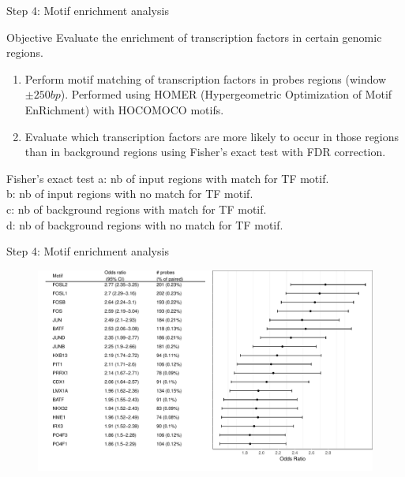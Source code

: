 \documentclass[slidestop,compress,11pt,xcolor=dvipsnames]{beamer}
\begin{document}
\begin{frame}{Step 4: Motif enrichment analysis}

\begin{block}{Objective}
Evaluate the enrichment of transcription factors in certain genomic regions.
\begin{enumerate}
  \item Perform motif matching of transcription factors in probes regions (window $\pm250bp$). Performed using HOMER (Hypergeometric Optimization of Motif EnRichment) with HOCOMOCO motifs.
  \item Evaluate which transcription factors are more likely to occur in those regions than in background regions
  using Fisher’s exact test with FDR correction.
\end{enumerate}
\end{block}
 \begin{exampleblock}{Fisher’s exact test}
 a: nb of input regions with match for TF motif.\\
 b: nb of input regions with no match for TF motif.\\
 c: nb of background regions with match for TF motif.\\
 d: nb of background regions with no match for TF motif.
 \end{exampleblock}

\end{frame}

\begin{frame}{Step 4: Motif enrichment analysis}
  \vspace{-0.5cm} 
  \begin{figure}
  \hspace*{-1cm} 
  \includegraphics[width=1.1\linewidth]{ELMER/motif_enrichment.pdf}
 \end{figure}
\end{frame}
\end{document}
